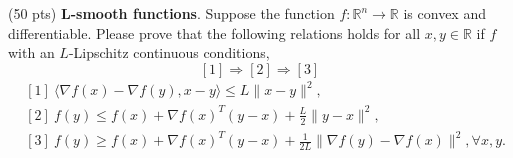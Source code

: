 \item {\color{red} (50 pts)} \textbf{L-smooth functions}. Suppose the function $f: \mathbb{R}^n \rightarrow \mathbb{R}$ is convex and differentiable. Please prove that the following relations holds for all $x, y \in \mathbb{R}$ if $f$ with an $L$-Lipschitz continuous conditions,
$$[1] \Rightarrow[2] \Rightarrow[3]$$
\begin{align*}
    & [1]\  \langle\nabla f(x)-\nabla f(y), x-y\rangle \leq L\|x-y\|^2,\\
    & [2]\  f(y) \leq f(x)+\nabla f(x)^T(y-x)+\frac{L}{2}\|y-x\|^2,\\
    & [3]\  f(y) \geq f(x)+\nabla f(x)^T(y-x)+\frac{1}{2 L}\|\nabla f(y)-\nabla f(x)\|^2, \forall x, y.
\end{align*}

\solution{}






\newpage